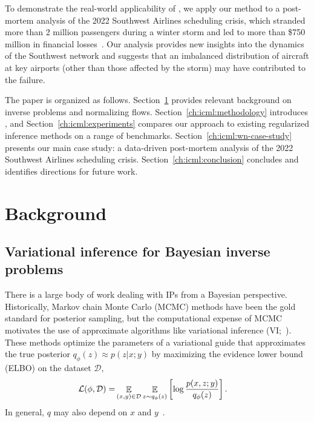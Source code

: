 To demonstrate the real-world applicability of \ouralg{}, we apply our method to a post-mortem analysis of the 2022 Southwest Airlines scheduling crisis, which stranded more than 2 million passengers during a winter storm and led to more than \$750 million in financial losses~\cite{roseSouthwestWillPay2023}. Our analysis provides new insights into the dynamics of the Southwest network and suggests that an imbalanced distribution of aircraft at key airports (other than those affected by the storm) may have contributed to the failure.

The paper is organized as follows. Section~\ref{ch:icml:background} provides relevant background on inverse problems and normalizing flows. Section~\ref{ch:icml:methodology} introduces \ouralg{}, and Section~\ref{ch:icml:experiments} compares our approach to existing regularized inference methods on a range of benchmarks. Section~\ref{ch:icml:wn-case-study} presents our main case study: a data-driven post-mortem analysis of the 2022 Southwest Airlines scheduling crisis. Section~\ref{ch:icml:conclusion} concludes and identifies directions for future work.

\section{Background}\label{ch:icml:background}

\subsection{Variational inference for Bayesian inverse problems}

There is a large body of work dealing with IPs from a Bayesian perspective. Historically, Markov chain Monte Carlo (MCMC) methods have been the gold standard for posterior sampling, but the computational expense of MCMC motivates the use of approximate algorithms like variational inference (VI;~\cite{stuartInverseProblemsBayesian2010}). These methods optimize the parameters of a variational guide that approximates the true posterior $q_{\phi}(z) \approx p(z | x; y)$ by maximizing the evidence lower bound (ELBO) on the dataset $\mathcal{D}$,
\begin{align}
    \mathcal{L}(\phi, \mathcal{D}) = & \mathop{\mathbb{E}}_{(x, y) \in \mathcal{D}} \mathop{\mathbb{E}}_{z\sim q_{\phi}(z)}\left[ \log \frac{p(x, z; y)}{q_\phi (z)} \right]. \label{ch:icml:eq:elbo}
\end{align}
In general, $q$ may also depend on $x$ and $y$~\cite{kingmaAutoEncodingVariationalBayes2014}.

